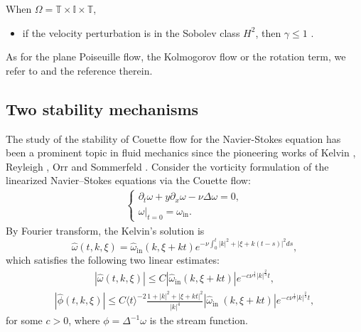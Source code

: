 \documentclass[reqno, 12pt]{amsart} %
\theoremstyle{plain} %
\theoremstyle{definition}
\theoremstyle{remark}
\numberwithin{equation}{section} %
\begin{document}
	When $\Omega=\mathbb{T} \times \mathbb{I} \times \mathbb{T}$,
	\begin{itemize}
		\item if the velocity perturbation is in the Sobolev class $H^2$, then $\gamma \leq 1$ \cite{CWZ2024}.
	\end{itemize}
	
	As for the  plane Poiseuille flow, the Kolmogorov flow or the rotation term, we refer to \cite{ZEW2020,DL2022,DL2024,CWZ2023,CDLZ2024, HSX2024-1, LWZ2020} and the reference therein.
	
	
	\subsection{Two stability mechanisms}
	The study of the stability of Couette flow for the Navier-Stokes equation has been a prominent topic in fluid mechanics since the pioneering works of Kelvin \cite{K1887}, Reyleigh \cite{R1879}, Orr \cite{O1907} and Sommerfeld \cite{S1908}. Consider the vorticity formulation of the linearized Navier–Stokes equations via the Couette flow:
	\begin{equation*}\begin{aligned} 
			\left\{\begin{array}{l}
				\partial_t \omega+y \partial_x \omega-\nu \Delta \omega=0,  \\
				\left. \omega\right|_{t=0}=\omega_{\mathrm {in}}.
			\end{array}\right.	
	\end{aligned}\end{equation*}
	By Fourier transform, the Kelvin's solution is
	$$
	\hat{\omega}(t, k, \xi)=\hat{\omega}_{\mathrm{in}}(k, \xi+k t) e^{-\nu \int_0^t|k|^2+|\xi+k(t-s)|^2 d s},
	$$
	which satisfies the following two linear estimates:
	\begin{equation}\begin{aligned} \label{eq:enhanced dissipation}
			|\hat{\omega}(t, k, \xi)| \leq C\left|\hat{\omega}_{\mathrm{in}}(k, \xi+k t)\right| e^{-c \nu^{\frac{1}{3}}|k|^{\frac{2}{3}} t},
	\end{aligned}\end{equation}
	\begin{equation}\begin{aligned}  \label{eq:inviscid damping}
			|\hat{\phi}(t, k, \xi)| \leq C\langle t\rangle^{-2} \frac{1+|k|^2+|\xi+k t|^2}{|k|^4}\left|\hat{\omega}_{\text {in }}(k, \xi+k t)\right| e^{-c \nu^{\frac{1}{3}}|k|^{\frac{2}{3}} t},
	\end{aligned}\end{equation}
	for some $c>0$, where $\phi=\Delta^{-1} \omega$ is the stream function.
	
\end{document}
